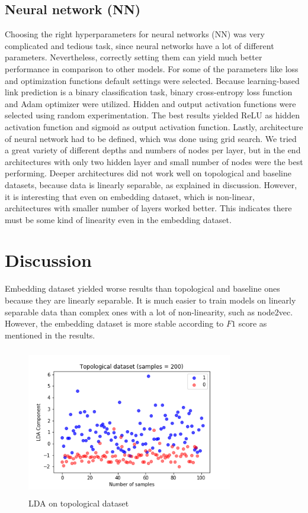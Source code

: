 \documentclass[9pt,twocolumn,twoside]{pnas-new}
\begin{document}
\subsection*{Neural network (NN)}

Choosing the right hyperparameters for neural networks (NN) was very complicated and tedious task, since neural networks have a lot of different parameters. Nevertheless, correctly setting them can yield much better performance in comparison to other models. For some of the parameters like loss and optimization functions default settings were selected. Because learning-based link prediction is a binary classification task, binary cross-entropy loss function and Adam optimizer were utilized. Hidden and output activation functions were selected using random experimentation. The best results yielded ReLU as hidden activation function and sigmoid as output activation function. Lastly, architecture of neural network had to be defined, which was done using grid search. We tried a great variety of different depths and numbers of nodes per layer, but in the end architectures with only two hidden layer and small number of nodes were the best performing. Deeper architectures did not work well on topological and baseline datasets, because data is linearly separable, as explained in discussion. However, it is interesting that even on embedding dataset, which is non-linear, architectures with smaller number of layers worked better. This indicates there must be some kind of linearity even in the embedding dataset. 









\section*{Discussion}

Embedding dataset yielded worse results than topological and baseline ones because they are linearly separable. It is much easier to train models on linearly separable data than complex ones with a lot of non-linearity, such as node2vec. However, the embedding dataset is more stable according to $F1$ score as mentioned in the results.




\begin{figure}[h!]%
\centering
\includegraphics[width=9cm, height=6.5cm]{toplda.png}
\caption{LDA on topological dataset}
\label{fig:toplda}
\end{figure}
\end{document}
